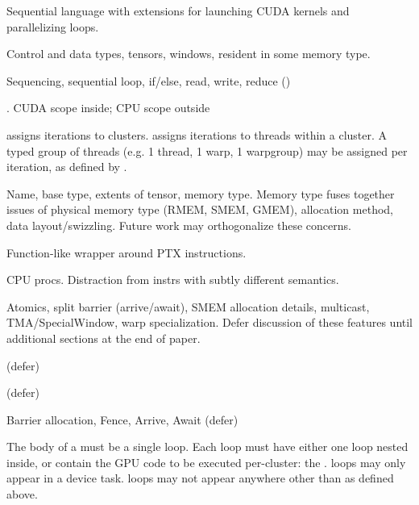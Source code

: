 

Sequential language with extensions for launching CUDA kernels and parallelizing loops.

Control and data types, tensors, windows, resident in some memory type.

 Sequencing, sequential loop, if/else, read, write, reduce (\lighttt{+=})

 .
CUDA scope inside; CPU scope outside

  assigns iterations to clusters.
 assigns iterations to threads within a cluster.
A typed group of threads (e.g. 1 thread, 1 warp, 1 warpgroup) may be assigned per iteration, as defined by .

 Name, base type, extents of tensor, memory type.
Memory type fuses together issues of physical memory type (RMEM, SMEM, GMEM), allocation method, data layout/swizzling.
Future work may orthogonalize these concerns.

 Function-like wrapper around PTX instructions.

 CPU procs. Distraction from instrs with subtly different semantics.

Atomics, split barrier (arrive/await), SMEM allocation details, multicast, TMA/SpecialWindow, warp specialization.
Defer discussion of these features until additional sections at the end of paper.

 (defer)

 (defer)

 Barrier allocation, Fence, Arrive, Await (defer)


The body of a  must be a single  loop.
Each  loop must have either one  loop nested inside,
or contain the GPU code to be executed per-cluster: the .
 loops may only appear in a device task.
 loops may not appear anywhere other than as defined above.

